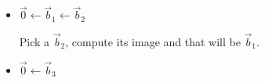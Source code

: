 \documentclass[11pt,fleqn]{book}
\begin{document}
\begin{example}
        \begin{itemize}
            \item $\vec{0} \leftarrow \vec{b}_1 \leftarrow \vec{b}_2$
            
            Pick a $\vec{b}_2$, compute its image and that will be $\vec{b}_1$. 
            
            \item $\vec{0} \leftarrow \vec{b}_3$
        \end{itemize}
    \end{example}
\end{document}
